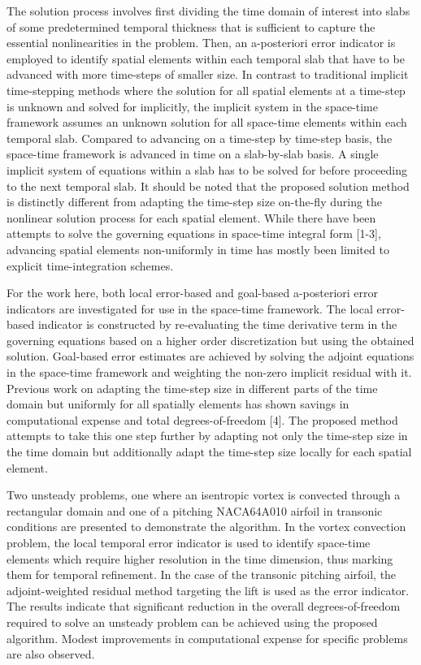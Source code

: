 \documentclass{report}
\begin{document}
The solution process involves first dividing the time domain of interest
into slabs of some predetermined temporal thickness that is sufficient to
capture the essential nonlinearities in the problem. Then, an
a-posteriori error indicator is employed to identify spatial elements
within each temporal slab that have to be advanced with more time-steps
of smaller size. In contrast to traditional implicit time-stepping
methods where the solution for all spatial elements at a time-step is
unknown and solved for implicitly, the implicit system in the space-time
framework assumes an unknown solution for all space-time elements within
each temporal slab. Compared to advancing on a time-step by time-step
basis, the space-time framework is advanced in time on a slab-by-slab
basis. A single implicit system of equations within a slab has to be
solved for before proceeding to the next temporal slab. It should be
noted that the proposed solution method is distinctly different from
adapting the time-step size on-the-fly during the nonlinear solution
process for each spatial element. While there have been attempts to solve
the governing equations in space-time integral form [1-3], advancing
spatial elements non-uniformly in time has mostly been limited to
explicit time-integration schemes.

For the work here, both local error-based and goal-based a-posteriori
error indicators are investigated for use in the space-time framework.
The local error-based indicator is constructed by re-evaluating the time
derivative term in the governing equations based on a higher order
discretization but using the obtained solution. Goal-based error
estimates are achieved by solving the adjoint equations in the space-time
framework and weighting the non-zero implicit residual with it. Previous
work on adapting the time-step size in different parts of the time domain
but uniformly for all spatially elements has shown savings in
computational expense and total degrees-of-freedom [4]. The proposed
method attempts to take this one step further by adapting not only the
time-step size in the time domain but additionally adapt the time-step
size locally for each spatial element.


Two unsteady problems, one where an isentropic vortex is convected
through a rectangular domain and one of a pitching NACA64A010 airfoil in
transonic conditions are presented to demonstrate the algorithm. In the
vortex convection problem, the local temporal error indicator is used to
identify space-time elements which require higher resolution in the time
dimension, thus marking them for temporal refinement. In the case of the
transonic pitching airfoil, the adjoint-weighted residual method
targeting the lift is used as the error indicator. The results indicate
that significant reduction in the overall degrees-of-freedom required to
solve an unsteady problem can be achieved using the proposed algorithm.
Modest improvements in computational expense for specific problems are
also observed.
\end{document}
